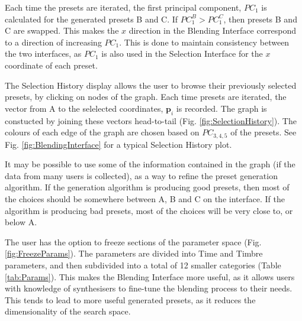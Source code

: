 \documentclass[11pt, oneside]{report}   	%
\renewcommand{\vec}[1]{\mathbf{#1}}
\begin{document}
Each time the presets are iterated, the first principal component, $PC_{1}$ is calculated for the generated presets B and C. If $PC_{1}^B > PC_{1}^C $, then presets B and C are swapped. This makes the $x$ direction in the Blending Interface correspond to a direction of increasing $PC_{1}$. This is done to maintain consistency between the two interfaces, as $PC_{1}$ is also used in the Selection Interface for the $x$ coordinate of each preset.

The Selection History display allows the user to browse their previously selected presets, by clicking on nodes of the graph. Each time presets are iterated, the vector from A to the selelected coordinates, $\vec{p}_i$ is recorded. The graph is constucted by joining these vectors head-to-tail (Fig. \ref{fig:SelectionHistory}). The colours of each edge of the graph are chosen based on $PC_{3,4,5}$ of the presets. See Fig. \ref{fig:BlendingInterface} for a typical  Selection History plot.

It may be possible to use some of the information contained in the graph (if the data from many users is collected), as a way to refine the preset generation algorithm. If the generation algorithm is producing good presets, then most of the choices should be somewhere between A, B and C on the interface. If the algorithm is producing bad presets, most of the choices will be very close to, or below A.

The user has the option to freeze sections of the parameter space (Fig. \ref{fig:FreezeParams}). The parameters are divided into Time and Timbre parameters, and then subdivided into a total of 12 smaller categories (Table \ref{tab:Params}). This makes the Blending Interface more useful, as it allows users with knowledge of synthesisers to fine-tune the blending process to their needs. This tends to lead to more useful generated presets, as it reduces the dimensionality of the search space.
\end{document}
